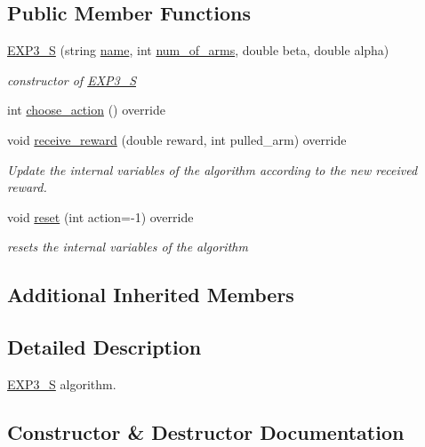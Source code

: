 \subsection*{Public Member Functions}
\begin{DoxyCompactItemize}
\item 
\mbox{\hyperlink{class_e_x_p3___s_ac5cd1864b3f23afbc5876a291c2a16d1}{E\+X\+P3\+\_\+S}} (string \mbox{\hyperlink{class_m_a_b_algorithm_a77b10ecc4b49d519c557f65358167b82}{name}}, int \mbox{\hyperlink{class_m_a_b_algorithm_a340fa9e83e85b092f2c6125fc4e8549b}{num\+\_\+of\+\_\+arms}}, double beta, double alpha)
\begin{DoxyCompactList}\small\item\em constructor of \mbox{\hyperlink{class_e_x_p3___s}{E\+X\+P3\+\_\+S}} \end{DoxyCompactList}\item 
int \mbox{\hyperlink{class_e_x_p3___s_afc9e4825004f5f541f774ac0debe6bee}{choose\+\_\+action}} () override
\item 
void \mbox{\hyperlink{class_e_x_p3___s_a93cef92a4f0213f7d247768b610071ad}{receive\+\_\+reward}} (double reward, int pulled\+\_\+arm) override
\begin{DoxyCompactList}\small\item\em Update the internal variables of the algorithm according to the new received reward. \end{DoxyCompactList}\item 
void \mbox{\hyperlink{class_e_x_p3___s_a70bfd4fc19a73ab7d2903672c36b2765}{reset}} (int action=-\/1) override
\begin{DoxyCompactList}\small\item\em resets the internal variables of the algorithm \end{DoxyCompactList}\end{DoxyCompactItemize}
\subsection*{Additional Inherited Members}


\subsection{Detailed Description}
\mbox{\hyperlink{class_e_x_p3___s}{E\+X\+P3\+\_\+S}} algorithm. 

\subsection{Constructor \& Destructor Documentation}
\mbox{\label{class_e_x_p3___s_ac5cd1864b3f23afbc5876a291c2a16d1}} 
